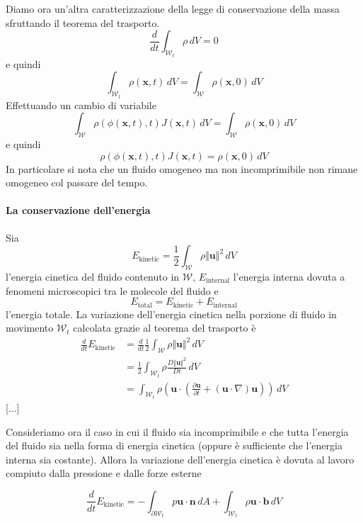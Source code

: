 Diamo ora un'altra caratterizzazione della legge di conservazione della massa sfruttando il teorema del trasporto.
$$\frac{d}{dt}\int_{\mathcal{W}_t}\rho\,dV=0$$
e quindi
$$\int_{\mathcal{W}_t}\rho(\mathbf{x},t)\,dV=\int_\mathcal{W}\rho(\mathbf{x},0)\,dV$$
Effettuando un cambio di variabile
$$\int_{\mathcal{W}}\rho(\phi(\mathbf{x},t),t)J(\mathbf{x},t)\,dV=\int_\mathcal{W}\rho(\mathbf{x},0)\,dV$$
e quindi
\begin{equation}
  \boxed{
  \rho(\phi(\mathbf{x},t),t)J(\mathbf{x},t)=\rho(\mathbf{x},0)\,dV
  }
\end{equation}
In particolare si nota che un fluido omogeneo ma non incomprimibile non rimane omogeneo col passare del tempo.

\paragraph{La conservazione dell'energia}
Sia $$E_{\text{kinetic}} = \frac{1}{2} \int_{\mathcal{W}} \rho \Vert \mathbf{u} \Vert^2 \, dV$$ l'energia cinetica del fluido contenuto in $\mathcal{W}$, $E_{\text{internal}}$ l'energia interna dovuta a fenomeni microscopici tra le molecole del fluido e $$E_{\text{total}}=E_{\text{kinetic}}+E_{\text{internal}}$$ l'energia totale.
La variazione dell'energia cinetica nella porzione di fluido in movimento $\mathcal{W}_t$ calcolata grazie al teorema del trasporto è 
\begin{equation}
\begin{split}
\frac{d}{dt} E_{\text{kinetic}} &= \frac{d}{dt} \frac{1}{2} \int_{\mathcal{W}} \rho \Vert \mathbf{u} \Vert^2 \, dV \\
                                &= \frac{1}{2}  \int_{\mathcal{W}_t} \rho \frac{D\Vert \mathbf{u} \Vert^2}{Dt} \, dV \\
                                &=  \int_{\mathcal{W}_t} \rho ( \mathbf{u} \cdot ( \frac{\partial \mathbf{u}}{\partial t} + (\mathbf{u} \cdot \nabla) \mathbf{u} )) \, dV
\end{split}
\end{equation}
[...]

Consideriamo ora il caso in cui il fluido sia incomprimibile e che tutta l'energia del fluido sia nella forma di energia cinetica (oppure è sufficiente che l'energia interna sia costante). Allora la variazione dell'energia cinetica è dovuta al lavoro compiuto dalla pressione e dalle forze esterne

$$\frac{d}{dt} E_{\text{kinetic}} = - \int_{\partial \mathcal{W}_t} p \mathbf{u} \cdot \mathbf{n} \, dA + \int_{\mathcal{W}_t} \rho \mathbf{u} \cdot \mathbf{b} \, dV $$

